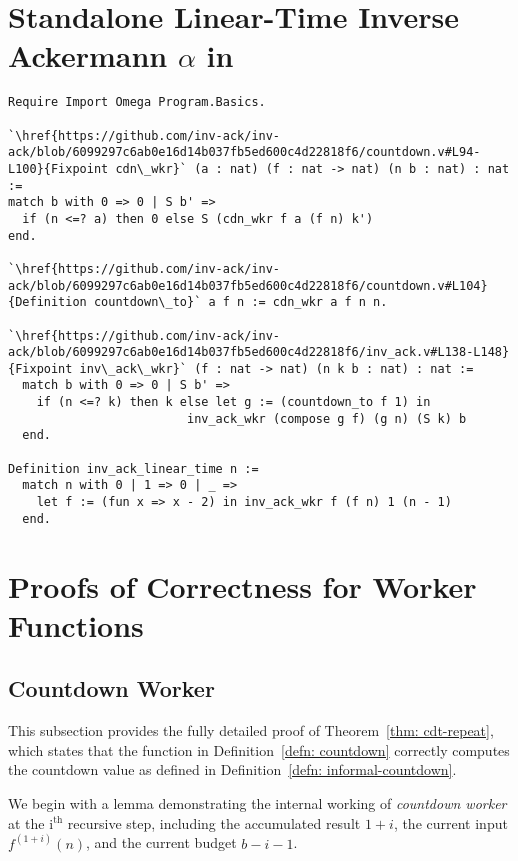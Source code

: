 \vspace{-1.25em}
\section{Standalone Linear-Time Inverse Ackermann $\alpha$ in }
\label{apx:code}

\vspace{-1em}

\begin{lstlisting}
Require Import Omega Program.Basics.

`\href{https://github.com/inv-ack/inv-ack/blob/6099297c6ab0e16d14b037fb5ed600c4d22818f6/countdown.v#L94-L100}{Fixpoint cdn\_wkr}` (a : nat) (f : nat -> nat) (n b : nat) : nat :=
match b with 0 => 0 | S b' =>
  if (n <=? a) then 0 else S (cdn_wkr f a (f n) k')
end.

`\href{https://github.com/inv-ack/inv-ack/blob/6099297c6ab0e16d14b037fb5ed600c4d22818f6/countdown.v#L104}{Definition countdown\_to}` a f n := cdn_wkr a f n n.

`\href{https://github.com/inv-ack/inv-ack/blob/6099297c6ab0e16d14b037fb5ed600c4d22818f6/inv_ack.v#L138-L148} {Fixpoint inv\_ack\_wkr}` (f : nat -> nat) (n k b : nat) : nat :=
  match b with 0 => 0 | S b' =>
    if (n <=? k) then k else let g := (countdown_to f 1) in
                         inv_ack_wkr (compose g f) (g n) (S k) b
  end.

Definition inv_ack_linear_time n :=
  match n with 0 | 1 => 0 | _ => 
    let f := (fun x => x - 2) in inv_ack_wkr f (f n) 1 (n - 1)
  end.
\end{lstlisting}

\section{Proofs of Correctness for Worker Functions}
\label{apx:proof_correct_worker}

\subsection{Countdown Worker}
\label{apx:proof_correct_countdown_worker}
This subsection provides the fully detailed proof of Theorem~\ref{thm: cdt-repeat}, which states that the function in Definition~\ref{defn: countdown} correctly computes the countdown value as defined in Definition~\ref{defn: informal-countdown}.

We begin with a lemma demonstrating the internal working of \emph{countdown worker} at the $\text{i}^\text{th}$ recursive step, including the accumulated result $1+i$, the current input $f^{(1+i)}(n)$, and the current budget $b-i-1$.

